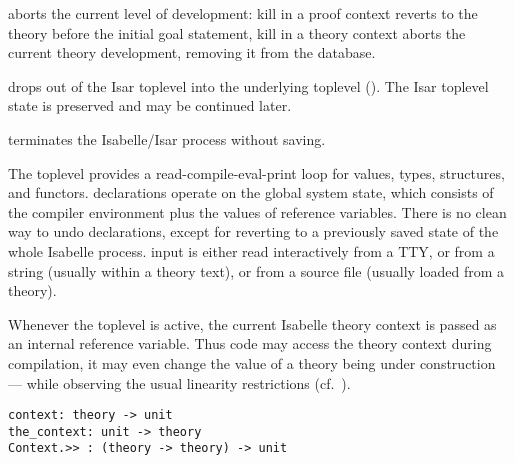 \begin{isabellebody}
\begin{isamarkuptext}
\begin{description}
  \item {} aborts the current level of development:
  kill in a proof context reverts to the theory before the initial
  goal statement, kill in a theory context aborts the current theory
  development, removing it from the database.

  \item {} drops out of the Isar toplevel into the
  underlying {\ML} toplevel ().  The Isar
  toplevel state is preserved and may be continued later.

  \item {} terminates the Isabelle/Isar process without
  saving.

  \end{description}%
\end{isamarkuptext}%
\isamarkuptrue%
%
\isamarkuptrue%
%
\begin{isamarkuptext}%
The {\ML} toplevel provides a read-compile-eval-print loop for {\ML}
  values, types, structures, and functors.  {\ML} declarations operate
  on the global system state, which consists of the compiler
  environment plus the values of {\ML} reference variables.  There is
  no clean way to undo {\ML} declarations, except for reverting to a
  previously saved state of the whole Isabelle process.  {\ML} input
  is either read interactively from a TTY, or from a string (usually
  within a theory text), or from a source file (usually loaded from a
  theory).

  Whenever the {\ML} toplevel is active, the current Isabelle theory
  context is passed as an internal reference variable.  Thus {\ML}
  code may access the theory context during compilation, it may even
  change the value of a theory being under construction --- while
  observing the usual linearity restrictions
  (cf.~).%
\end{isamarkuptext}%
\isamarkuptrue%
%
\isadelimmlref
%
\endisadelimmlref
%
\isatagmlref
%
\begin{isamarkuptext}%
\begin{mldecls}
  \verb|context: theory -> unit| \\
  \verb|the_context: unit -> theory| \\
  \verb|Context.>> : (theory -> theory) -> unit| \\
  \end{mldecls}


\end{isamarkuptext}
\end{isabellebody}
